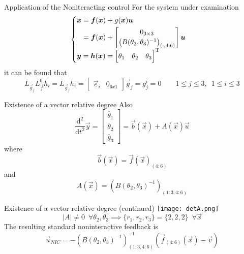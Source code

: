 \begin{frame}{Application of the Noniteracting control}
  For the system under examination
  \[
  \begin{cases}
    \begin{split}
      \dot{\boldsymbol{x}} &= \boldsymbol{f}(\boldsymbol{x}) + g(\boldsymbol{x})\boldsymbol{u}\\
      &=\boldsymbol{f}(\boldsymbol{x}) +
      \begin{bmatrix}
        0_{3\times3} \\
        \left(B(\theta_2,\theta_3) ^ {-1}\right)_{(:, 4:6)}
      \end{bmatrix}\boldsymbol{u}\\
    \end{split}\\
    \boldsymbol{y} = \boldsymbol{h}(\boldsymbol{x}) =
    \begin{bmatrix}
      \theta_1 &
      \theta_2 &
      \theta_3
    \end{bmatrix} ^{\mathrm{T}}
  \end{cases}
  \]
  it can be found that
  \[
  L_{\vec{g}_{j}}L_{\vec{f}}^{0}h_{i} =
  L_{\vec{g}_{j}}h_{i} = 
  \begin{bmatrix}
    \vec{e}_i & 0_{6x1}
  \end{bmatrix}
  \vec{g}_j
  =
  g_{j}^{i} = 0
  \qquad 1 \le j \le 3, \enspace 1 \le i \le 3
  \]

\end{frame}

\begin{frame}{Existence of a vector relative degree}
  Also 
  \[
  \frac{\mathrm{d}^{2}}{\mathrm{d}t^{2}}\vec{y} = 
  \begin{bmatrix}
    \ddot{\theta_1}\\
    \ddot{\theta_2}\\
    \ddot{\theta_3}
  \end{bmatrix} =
  \vec{b}(\vec{x}) + A(\vec{x}) \vec{u}
  \]
  where
  \[
  \vec{b}(\vec{x}) = \vec{f}(\vec{x})_{(4:6)}
  \]
  and
  \[
  A(\vec{x}) = \left(B(\theta_2,\theta_3) ^ {-1}\right)_{(1:3, 4:6)}
  \]
\end{frame}

\begin{frame}{Existence of a vector relative degree (continued)}
  \centering
  \texttt{[image: detA.png]}
  \[
  |A| \ne 0 \enspace \forall \theta_2, \theta_3 \implies \{r_1, r_2, r_3\} = \{2,2,2\} \enspace \forall \vec{x}
  \]
  The resulting standard noninteractive feedback is
  \[
  \vec{u}_{NIC} = -\left(B(\theta_2,\theta_3) ^ {-1}\right)_{(1:3, 4:6)}^{-1}
  (\vec{f}_{(4:6)}(\vec{x}) - \vec{v} )
  \]
\end{frame}

